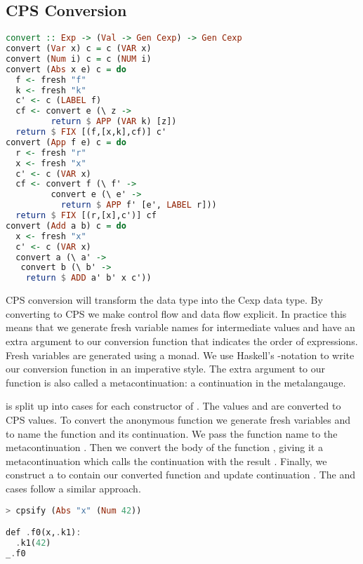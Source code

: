 \subsection{\label{subsection:cpsconvert}CPS Conversion}
\begin{lstlisting}[language=Haskell]
convert :: Exp -> (Val -> Gen Cexp) -> Gen Cexp
convert (Var x) c = c (VAR x)
convert (Num i) c = c (NUM i)
convert (Abs x e) c = do
  f <- fresh "f"
  k <- fresh "k"
  c' <- c (LABEL f)
  cf <- convert e (\ z ->
         return $ APP (VAR k) [z])
  return $ FIX [(f,[x,k],cf)] c'
convert (App f e) c = do
  r <- fresh "r"
  x <- fresh "x"
  c' <- c (VAR x)
  cf <- convert f (\ f' ->
         convert e (\ e' ->
           return $ APP f' [e', LABEL r]))
  return $ FIX [(r,[x],c')] cf
convert (Add a b) c = do
  x <- fresh "x"
  c' <- c (VAR x)
  convert a (\ a' ->
   convert b (\ b' ->
    return $ ADD a' b' x c'))
\end{lstlisting}

\ac{CPS} conversion will transform the  data type into the \ac{Cexp} data type. By converting to \ac{CPS} we make control flow and data flow explicit. In practice this means that we generate fresh variable names for intermediate values and have an extra argument to our conversion function that indicates the order of expressions. Fresh variables are generated using a monad. We use Haskell's -notation to write our conversion function in an imperative style. The extra argument to our function is also called a metacontinuation: a continuation in the metalangauge.

 is split up into cases for each constructor of . The values  and  are converted to \ac{CPS} values. To convert the anonymous function  we generate fresh variables  and  to name the function and its continuation. We pass the function name to the metacontinuation . Then we convert the body of the function , giving it a metacontinuation which calls the continuation with the result . Finally, we construct a  to contain our converted function and update continuation . The  and  cases follow a similar approach.

\begin{lstlisting}[language=Haskell]
> cpsify (Abs "x" (Num 42))

def .f0(x,.k1):
  .k1(42)
_.f0
\end{lstlisting}

